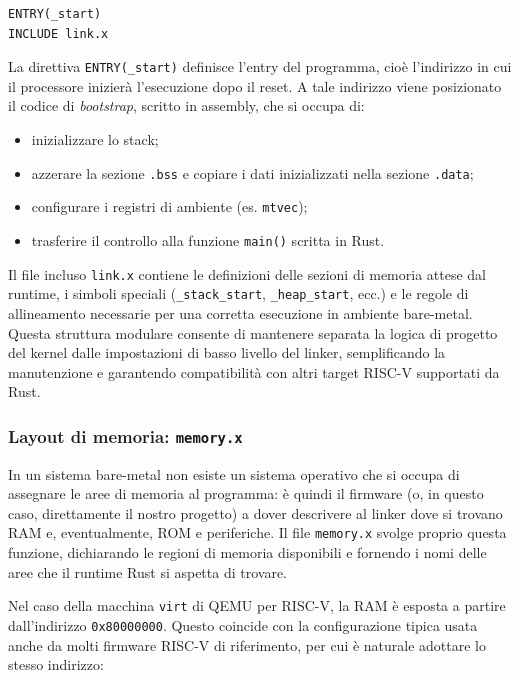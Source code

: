 \documentclass[italian, Lau, oneside]{sapthesis} %
\begin{document}
\begin{center}
\begin{verbatim}
ENTRY(_start)
INCLUDE link.x
\end{verbatim}
\end{center}

La direttiva \texttt{ENTRY(\_start)} definisce l'entry del programma, cioè l’indirizzo in cui il processore inizierà l’esecuzione dopo il reset.  
A tale indirizzo viene posizionato il codice di \emph{bootstrap}, scritto in assembly, che si occupa di:
\begin{itemize}
    \item inizializzare lo stack;
    \item azzerare la sezione \texttt{.bss} e copiare i dati inizializzati nella sezione \texttt{.data};
    \item configurare i registri di ambiente (es. \texttt{mtvec});
    \item trasferire il controllo alla funzione \texttt{main()} scritta in Rust.
\end{itemize}

Il file incluso \texttt{link.x} contiene le definizioni delle sezioni di memoria attese dal runtime, i simboli speciali (\texttt{\_stack\_start}, \texttt{\_heap\_start}, ecc.) e le regole di allineamento necessarie per una corretta esecuzione in ambiente bare-metal.  
Questa struttura modulare consente di mantenere separata la logica di progetto del kernel dalle impostazioni di basso livello del linker, semplificando la manutenzione e garantendo compatibilità con altri target RISC-V supportati da Rust.

\subsubsection*{Layout di memoria: \texttt{memory.x}}

In un sistema bare-metal non esiste un sistema operativo che si occupa di assegnare le aree di memoria al programma: è quindi il firmware (o, in questo caso, direttamente il nostro progetto) a dover descrivere al linker dove si trovano RAM e, eventualmente, ROM e periferiche.  
Il file \texttt{memory.x} svolge proprio questa funzione, dichiarando le regioni di memoria disponibili e fornendo i nomi delle aree che il runtime Rust si aspetta di trovare.

Nel caso della macchina \texttt{virt} di QEMU per RISC-V, la RAM è esposta a partire dall’indirizzo \texttt{0x80000000}. Questo coincide con la configurazione tipica usata anche da molti firmware RISC-V di riferimento, per cui è naturale adottare lo stesso indirizzo:
\end{document}
